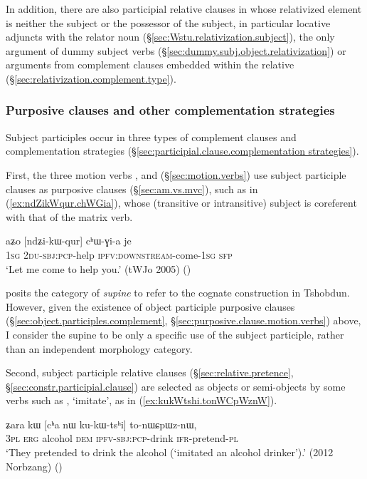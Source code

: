 In addition, there are also participial relative clauses in  whose relativized element is neither the subject or the possessor of the subject, in particular locative adjuncts with the relator noun  (§\ref{sec:Wstu.relativization.subject}), the only argument of dummy subject verbs (§\ref{sec:dummy.subj.object.relativization}) or arguments from complement clauses embedded within the relative (§\ref{sec:relativization.complement.type}).

  \subsubsection{Purposive clauses and other complementation strategies}  \label{sec:subject.participle.complementation}
Subject participles occur in three types of complement clauses and complementation strategies (§\ref{sec:participial.clause.complementation strategies}). 

First, the three motion verbs ,  and   (§\ref{sec:motion.verbs}) use subject participle clauses as purposive clauses (§\ref{sec:am.vs.mvc}), such as  in (\ref{ex:ndZikWqur.chWGia}), whose (transitive or intransitive) subject is coreferent with that of the matrix verb.

\begin{exe}
\ex \label{ex:ndZikWqur.chWGia}
\gll aʑo [ndʑi-kɯ-qur] cʰɯ-ɣi-a je \\
\textsc{1sg} \textsc{2du}-\textsc{sbj}:\textsc{pcp}-help \textsc{ipfv}:\textsc{downstream}-come-\textsc{1sg} \textsc{sfp} \\
\glt `Let me come to help you.' (tWJo 2005) ()
\end{exe} 

\citet{sun12complementation} posits the category of \textit{supine} to refer to the cognate construction in Tshobdun. However, given the existence of object participle purposive clauses (§\ref{sec:object.participles.complement}, §\ref{sec:purposive.clause.motion.verbs}) above, I consider the supine to be only a specific use of the subject participle, rather than an independent morphology category.

Second,  subject participle relative clauses (§\ref{sec:relative.pretence}, §\ref{sec:constr.participial.clause}) are selected as objects or semi-objects by some verbs such as , `imitate', as in  (\ref{ex:kukWtshi.tonWCpWznW}).

\begin{exe}
\ex \label{ex:kukWtshi.tonWCpWznW}
 \gll  ʑara kɯ [cʰa nɯ ku-kɯ-tsʰi] to-nɯɕpɯz-nɯ, \\
\textsc{3pl} \textsc{erg} alcohol \textsc{dem} \textsc{ipfv}-\textsc{sbj}:\textsc{pcp}-drink \textsc{ifr}-pretend-\textsc{pl} \\
\glt  `They pretended to drink the alcohol (`imitated an alcohol drinker').'  (2012 Norbzang) ()
\end{exe}

